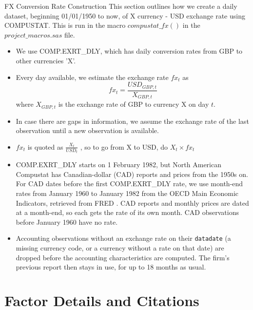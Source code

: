 \documentclass[12pt,title,fleqn]{article}
\begin{document}
\begin{section}{FX Conversion Rate Construction}
This section outlines how we create a daily dataset, beginning 01/01/1950 to now, of X currency - USD exchange rate using COMPUSTAT. This is run in the macro $compustat\_fx()$ in the $project\_macros.sas$ file.
    \begin{itemize}
        \item We use COMP.EXRT\_DLY, which has daily conversion rates from GBP to other currencies 'X'. 
        \item Every day available, we estimate the exchange rate $fx_t$ as 
            \begin{equation*}
                fx_t = \frac{USD_{GBP, t}}{X_{GBP, t}}
            \end{equation*}
            where $X_{GBP,t}$ is the exchange rate of GBP to currency X on day $t$. 
        \item In case there are gaps in information, we assume the exchange rate of the last observation until a new observation is available. 
        \item $fx_t$ is quoted as $\frac{X_t}{USD_t}$ , so to go from X to USD, do $X_t \times fx_t$
        \item COMP.EXRT\_DLY starts on 1 February 1982, but North American Compustat has Canadian-dollar (CAD) reports and prices from the 1950s on. For CAD dates before the first COMP.EXRT\_DLY rate, we use month-end rates from January 1960 to January 1982 from the OECD Main Economic Indicators, retrieved from FRED \cite{oecd_fx_cad}. CAD reports and monthly prices are dated at a month-end, so each gets the rate of its own month. CAD observations before January 1960 have no rate.
        \item Accounting observations without an exchange rate on their \texttt{datadate} (a missing currency code, or a currency without a rate on that date) are dropped before the accounting characteristics are computed. The firm's previous report then stays in use, for up to 18 months as usual.
    \end{itemize}

\end{section}

\section{Factor Details and Citations}
\end{document}
